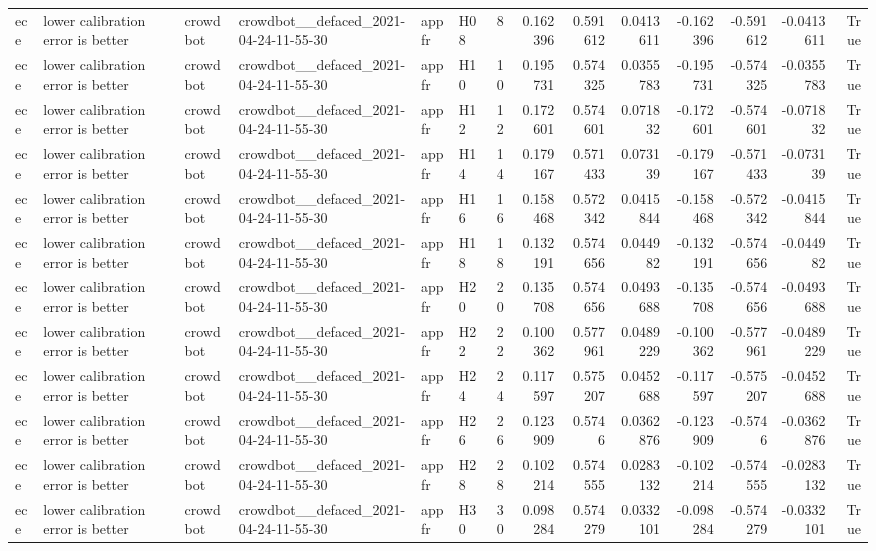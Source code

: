 \begin{longtable}{llllllrrrrrrrr}
ece & lower calibration error is better & crowdbot & crowdbot\_\_defaced\_2021-04-24-11-55-30 & appfr & H08 & 8 & 0.162396 & 0.591612 & 0.0413611 & -0.162396 & -0.591612 & -0.0413611 & True \\
ece & lower calibration error is better & crowdbot & crowdbot\_\_defaced\_2021-04-24-11-55-30 & appfr & H10 & 10 & 0.195731 & 0.574325 & 0.0355783 & -0.195731 & -0.574325 & -0.0355783 & True \\
ece & lower calibration error is better & crowdbot & crowdbot\_\_defaced\_2021-04-24-11-55-30 & appfr & H12 & 12 & 0.172601 & 0.574601 & 0.071832 & -0.172601 & -0.574601 & -0.071832 & True \\
ece & lower calibration error is better & crowdbot & crowdbot\_\_defaced\_2021-04-24-11-55-30 & appfr & H14 & 14 & 0.179167 & 0.571433 & 0.073139 & -0.179167 & -0.571433 & -0.073139 & True \\
ece & lower calibration error is better & crowdbot & crowdbot\_\_defaced\_2021-04-24-11-55-30 & appfr & H16 & 16 & 0.158468 & 0.572342 & 0.0415844 & -0.158468 & -0.572342 & -0.0415844 & True \\
ece & lower calibration error is better & crowdbot & crowdbot\_\_defaced\_2021-04-24-11-55-30 & appfr & H18 & 18 & 0.132191 & 0.574656 & 0.044982 & -0.132191 & -0.574656 & -0.044982 & True \\
ece & lower calibration error is better & crowdbot & crowdbot\_\_defaced\_2021-04-24-11-55-30 & appfr & H20 & 20 & 0.135708 & 0.574656 & 0.0493688 & -0.135708 & -0.574656 & -0.0493688 & True \\
ece & lower calibration error is better & crowdbot & crowdbot\_\_defaced\_2021-04-24-11-55-30 & appfr & H22 & 22 & 0.100362 & 0.577961 & 0.0489229 & -0.100362 & -0.577961 & -0.0489229 & True \\
ece & lower calibration error is better & crowdbot & crowdbot\_\_defaced\_2021-04-24-11-55-30 & appfr & H24 & 24 & 0.117597 & 0.575207 & 0.0452688 & -0.117597 & -0.575207 & -0.0452688 & True \\
ece & lower calibration error is better & crowdbot & crowdbot\_\_defaced\_2021-04-24-11-55-30 & appfr & H26 & 26 & 0.123909 & 0.5746 & 0.0362876 & -0.123909 & -0.5746 & -0.0362876 & True \\
ece & lower calibration error is better & crowdbot & crowdbot\_\_defaced\_2021-04-24-11-55-30 & appfr & H28 & 28 & 0.102214 & 0.574555 & 0.0283132 & -0.102214 & -0.574555 & -0.0283132 & True \\
ece & lower calibration error is better & crowdbot & crowdbot\_\_defaced\_2021-04-24-11-55-30 & appfr & H30 & 30 & 0.098284 & 0.574279 & 0.0332101 & -0.098284 & -0.574279 & -0.0332101 & True \\

\end{longtable}
